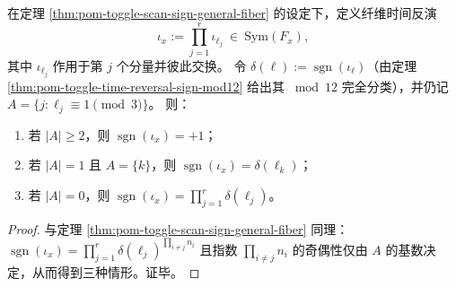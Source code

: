 \begin{theorem}[一般纤维时间反演对合的奇偶分解]\label{thm:pom-toggle-time-reversal-sign-general-fiber}
在定理 \ref{thm:pom-toggle-scan-sign-general-fiber} 的设定下，定义纤维时间反演
\[
\iota_x:=\prod_{j=1}^r \iota_{\ell_j}\ \in\ \mathrm{Sym}(F_x),
\]
其中 \(\iota_{\ell_j}\) 作用于第 \(j\) 个分量并彼此交换。
令 \(\delta(\ell):=\operatorname{sgn}(\iota_\ell)\)（由定理 \ref{thm:pom-toggle-time-reversal-sign-mod12} 给出其 \(\bmod 12\) 完全分类），并仍记 \(A=\{j:\ell_j\equiv 1\pmod 3\}\)。
则：
\begin{enumerate}
  \item 若 \(|A|\ge 2\)，则 \(\operatorname{sgn}(\iota_x)=+1\)；
  \item 若 \(|A|=1\) 且 \(A=\{k\}\)，则 \(\operatorname{sgn}(\iota_x)=\delta(\ell_k)\)；
  \item 若 \(|A|=0\)，则 \(\operatorname{sgn}(\iota_x)=\prod_{j=1}^r \delta(\ell_j)\)。
\end{enumerate}
\end{theorem}

\begin{proof}
与定理 \ref{thm:pom-toggle-scan-sign-general-fiber} 同理：
\(
\operatorname{sgn}(\iota_x)=\prod_{j=1}^r \delta(\ell_j)^{\prod_{i\ne j}n_i}
\)
且指数 \(\prod_{i\ne j}n_i\) 的奇偶性仅由 \(A\) 的基数决定，从而得到三种情形。证毕。
\end{proof}

